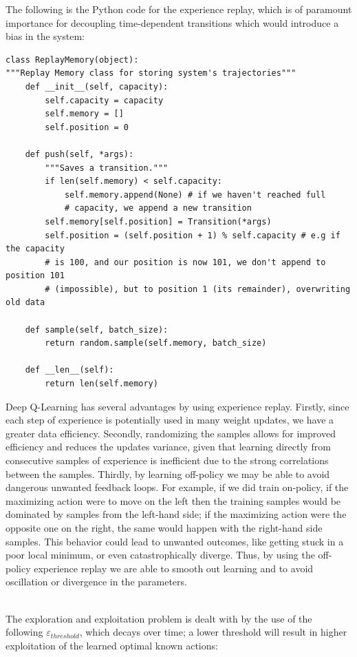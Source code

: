 \documentclass[11pt]{article}
\begin{document}
The following is the Python code for the experience replay, which is of paramount importance for decoupling time-dependent transitions which would introduce a bias in the system:
\begin{verbatim}
class ReplayMemory(object):
"""Replay Memory class for storing system's trajectories"""
    def __init__(self, capacity):
        self.capacity = capacity
        self.memory = []
        self.position = 0

    def push(self, *args):
        """Saves a transition."""
        if len(self.memory) < self.capacity:
            self.memory.append(None) # if we haven't reached full 
            # capacity, we append a new transition
        self.memory[self.position] = Transition(*args)  
        self.position = (self.position + 1) % self.capacity # e.g if the capacity 
        # is 100, and our position is now 101, we don't append to position 101
        # (impossible), but to position 1 (its remainder), overwriting old data

    def sample(self, batch_size):
        return random.sample(self.memory, batch_size) 

    def __len__(self): 
        return len(self.memory)
\end{verbatim}
Deep Q-Learning has several advantages by using experience replay. Firstly, since each step of experience is potentially used in many weight updates, we have a greater data efficiency. Secondly, randomizing the samples allows for improved efficiency and reduces the updates variance, given that learning directly from consecutive samples of experience is inefficient due to the strong correlations between the samples. Thirdly, by learning off-policy we may be able to avoid dangerous unwanted feedback loops. For example, if we did train on-policy, if the maximizing action were to move on the left then the training samples would be dominated by samples from the left-hand side; if the maximizing action were the opposite one on the right, the same would happen with the right-hand side samples. This behavior could lead to unwanted outcomes, like getting stuck in a poor local minimum, or even catastrophically diverge. Thus, by using the off-policy experience replay we are able to smooth out learning and to avoid oscillation or divergence in the parameters.



\\
The exploration and exploitation problem is dealt with by the use of the following $\varepsilon_{threshold}$, which decays over time; a lower threshold will result in higher exploitation of the learned optimal known actions:
\end{document}
